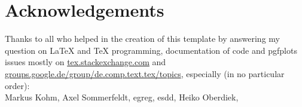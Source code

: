 \section*{Acknowledgements}
Thanks to all who helped in the creation of this template by answering my question on LaTeX and TeX programming, documentation of code and pgfplots issues mostly on \href{http://tex.stackexchange.com}{tex.stackexchange.com} and
\href{de.comp.text.tex}{groups.google.de/group/de.comp.text.tex/topics}, especially (in no particular order): \\
Markus Kohm, %
Axel Sommerfeldt, %
egreg, %
esdd,
Heiko Oberdiek, %
